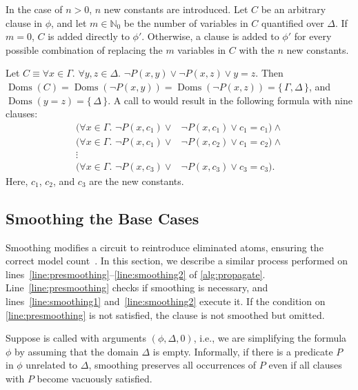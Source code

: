 \documentclass[a4paper,UKenglish,cleveref, autoref, thm-restate]{lipics-v2021}
\DeclareMathOperator{\Doms}{Doms}
\begin{document}
In the case of $n>0$, $n$ new constants are introduced. Let $C$ be an arbitrary
clause in $\phi$, and let $m \in \mathbb{N}_{0}$ be the number of variables in
$C$ quantified over $\Delta$. If $m=0$, $C$ is added directly to $\phi'$.
Otherwise, a clause is added to $\phi'$ for every possible combination of
replacing the $m$ variables in $C$ with the $n$ new constants.

\begin{example}
  Let $C \equiv \forall x \in \Gamma\text{. }\forall y, z \in \Delta\text{.
  } \neg P(x, y) \lor \neg P(x, z) \lor y=z$. Then
  $\Doms(C) = \Doms(\neg P(x, y)) = \Doms(\neg P(x, z)) = \{\, \Gamma, \Delta \,\}$,
  and $\Doms(y=z) = \{\, \Delta \,\}$. A call to  would result in the following formula with nine clauses:
  \begin{align*}
    (\forall x \in \Gamma\text{. }\neg P(x, c_{1}) \lor& \neg P(x, c_{1}) \lor c_{1}=c_{1})\land{}\\
    (\forall x \in \Gamma\text{. }\neg P(x, c_{1}) \lor& \neg P(x, c_{2}) \lor c_{1}=c_{2})\land{}\\
    \vdots&\\
    (\forall x \in \Gamma\text{. }\neg P(x, c_{3}) \lor& \neg P(x, c_{3}) \lor c_{3}=c_{3}).
  \end{align*}
  Here, $c_{1}$, $c_{2}$, and $c_{3}$ are the new constants.
\end{example}

\subsection{Smoothing the Base Cases}\label{sec:smoothing}

Smoothing modifies a circuit to reintroduce eliminated atoms, ensuring the
correct model count~\cite{darwiche2001tractable,DBLP:conf/ijcai/BroeckTMDR11}.
In this section, we describe a similar process performed on
lines~\ref{line:presmoothing}--\ref{line:smoothing2} of \cref{alg:propagate}.
Line~\ref{line:presmoothing} checks if smoothing is necessary, and
lines~\ref{line:smoothing1} and~\ref{line:smoothing2} execute it. If the
condition on \autoref{line:presmoothing} is not satisfied, the clause is not
smoothed but omitted.

Suppose \Propagate is called with arguments $(\phi, \Delta, 0)$, i.e., we are
simplifying the formula $\phi$ by assuming that the domain $\Delta$ is empty.
Informally, if there is a predicate $P$ in $\phi$ unrelated to $\Delta$,
smoothing preserves all occurrences of $P$ even if all clauses with $P$ become
vacuously satisfied.
\end{document}
